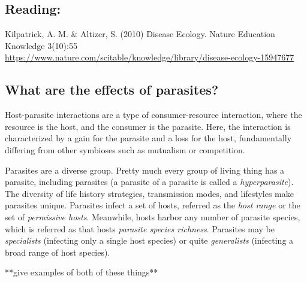 \documentclass[12pt]{article}
\begin{document}
\subsection*{Reading:}

Kilpatrick, A. M. \& Altizer, S. (2010) Disease Ecology. Nature Education Knowledge 3(10):55 \\ \url{https://www.nature.com/scitable/knowledge/library/disease-ecology-15947677}




















\begin{center}
\noindent\hrulefill 
\end{center}



\clearpage






\subsection*{What are the effects of parasites?}

Host-parasite interactions are a type of consumer-resource interaction, where the resource is the host, and the consumer is the parasite. Here, the interaction is characterized by a gain for the parasite and a loss for the host, fundamentally differing from other symbioses such as mutualism or competition. 


Parasites are a diverse group. Pretty much every group of living thing has a parasite, including parasites (a parasite of a parasite is called a \textit{hyperparasite}). The diversity of life history strategies, transmission modes, and lifestyles make parasites unique. Parasites infect a set of hosts, referred as the \textit{host range} or the set of \textit{permissive hosts}. Meanwhile, hosts harbor any number of parasite species, which is referred as that hosts \textit{parasite species richness}. Parasites may be \textit{specialists} (infecting only a single host species) or quite \textit{generalists} (infecting a broad range of host species). 


**give examples of both of these things**
\end{document}
